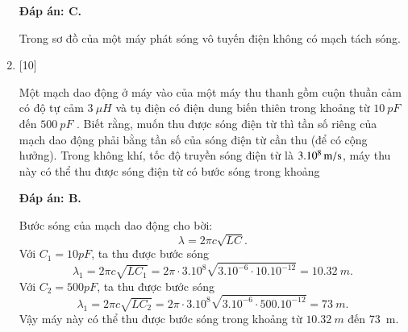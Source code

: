 \begin{enumerate}[label=\bfseries Câu \arabic*:]
	\hideall
	{		\textbf{Đáp án: C.}
		
		Trong sơ đồ của một máy phát sóng vô tuyến điện không có mạch tách sóng. 
		
	}
	
	\item {} [10]
	
	{Một mạch dao động ở máy vào của một máy thu thanh gồm cuộn thuần cảm có độ tự cảm $\SI{3}{\mu H}$ và tụ điện có điện dung biến thiên trong khoảng từ $\SI{10}{pF}$ đến $ \SI{500}{pF} $ . Biết rằng, muốn thu được sóng điện từ thì tần số riêng của mạch dao động phải bằng tần số của sóng điện từ cần thu (để có cộng hưởng). Trong không khí, tốc độ truyền sóng điện từ là $ \xsi{3.10^{8}}{m/s} $, máy thu này có thể thu được sóng điện từ có bước sóng trong khoảng
		
	}
	
	\hideall
	{		\textbf{Đáp án: B.}
		
		Bước sóng của mạch dao động cho bời:
		$$
		\lambda=2 \pi c \sqrt{L C}.
		$$
		Với $C_{1}=10 p F$, ta thu được bước sóng
		$$
		\lambda_{1}=2 \pi c \sqrt{L C_{1}}=2 \pi \cdot 3.10^{8} \sqrt{3.10^{-6} \cdot 10.10^{-12}}= \SI{10,32}{m}.
		$$
		Với $C_{2}=500 p F$, ta thu được bước sóng
		$$
		\lambda_{1}=2 \pi c \sqrt{L C_{2}}=2 \pi \cdot 3.10^{8} \sqrt{3.10^{-6} \cdot 500.10^{-12}}= \SI{73}{m}.
		$$
		Vậy máy này có thể thu được bước sóng trong khoảng từ $\SI{10,32}{m}$ đến \SI{73}{m}.
		
	}
	
\end{enumerate}

